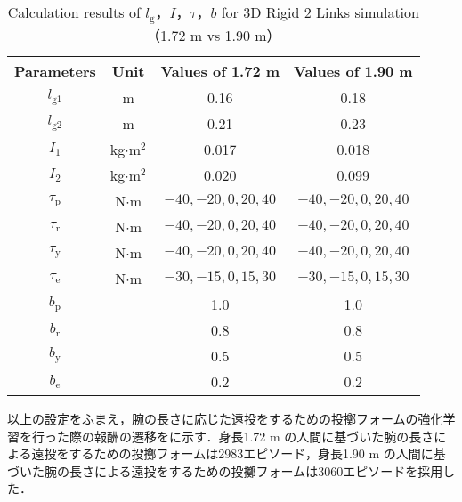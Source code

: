\begin{table}[tb]
  \begin{center}
    \caption{Calculation results of $l_{\mathrm{g}}$，$I$，$\tau$，$b$ for 3D Rigid 2 Links simulation （1.72 m vs 1.90 m）}
    \begin{tabular}{c|c|c|c}
      \hline
      Parameters & Unit & Values of 1.72 m & Values of 1.90 m \\
      \hline
      $l_{\mathrm{g1}}$ & m & 0.16 & 0.18 \\
      $l_{\mathrm{g2}}$ & m & 0.21 & 0.23 \\
      $I_{1}$ & kg$\cdot$$\mathrm{m}^2$ & 0.017 & 0.018 \\
      $I_{2}$ & kg$\cdot$$\mathrm{m}^2$ & 0.020 & 0.099 \\
      $\tau_{\mathrm{p}}$ & N$\cdot$m & $-40, -20, 0, 20, 40$ & $-40, -20, 0, 20, 40$ \\
      $\tau_{\mathrm{r}}$ & N$\cdot$m & $-40, -20, 0, 20, 40$ & $-40, -20, 0, 20, 40$ \\
      $\tau_{\mathrm{y}}$ & N$\cdot$m & $-40, -20, 0, 20, 40$ & $-40, -20, 0, 20, 40$ \\
      $\tau_{\mathrm{e}}$ & N$\cdot$m & $-30, -15, 0, 15, 30$ & $-30, -15, 0, 15, 30$ \\
      $b_{\mathrm{p}}$ &  & 1.0 & 1.0\\
      $b_{\mathrm{r}}$ &  & 0.8 & 0.8\\
      $b_{\mathrm{y}}$ &  & 0.5 & 0.5\\
      $b_{\mathrm{e}}$ &  & 0.2 & 0.2\\
      \hline
    \end{tabular}
  \end{center}
\end{table}

以上の設定をふまえ，腕の長さに応じた遠投をするための投擲フォームの強化学習を行った際の報酬の遷移をに示す．身長1.72 m の人間に基づいた腕の長さによる遠投をするための投擲フォームは2983エピソード，身長1.90 m の人間に基づいた腕の長さによる遠投をするための投擲フォームは3060エピソードを採用した．


